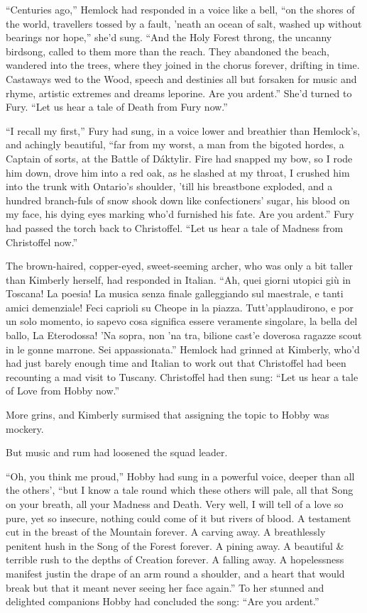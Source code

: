 \documentclass[11pt,a5paper]{article}
\begin{document}
``Centuries ago,'' Hemlock had responded in a voice like a bell, ``on the shores of the world, travellers tossed by a fault, 'neath an ocean of salt, washed up without bearings nor hope,'' she'd sung. ``And the Holy Forest throng, the uncanny birdsong, called to them more than the reach. They abandoned the beach, wandered into the trees, where they joined in the chorus forever, drifting in time. Castaways wed to the Wood, speech and destinies all but forsaken for music and rhyme, artistic extremes and dreams leporine. Are you ardent.'' She'd turned to Fury. ``Let us hear a tale of Death from Fury now.''

``I recall my first,'' Fury had sung, in a voice lower and breathier than Hemlock's, and achingly beautiful, ``far from my worst, a man from the bigoted hordes, a Captain of sorts, at the Battle of Dáktylir. Fire had snapped my bow, so I rode him down, drove him into a red oak, as he slashed at my throat, I crushed him into the trunk with Ontario's shoulder, 'till his breastbone exploded, and a hundred branch-fuls of snow shook down like confectioners' sugar, his blood on my face, his dying eyes marking who'd furnished his fate. Are you ardent.'' Fury had passed the torch back to Christoffel. ``Let us hear a tale of Madness from Christoffel now.''

The brown-haired, copper-eyed, sweet-seeming archer, who was only a bit taller than Kimberly herself, had responded in Italian. ``Ah, quei giorni utopici giù in Toscana! La poesia! La musica senza finale galleggiando sul maestrale, e tanti amici demenziale! Feci caprioli su Cheope in la piazza. Tutt'applaudirono, e por un solo momento, io sapevo cosa significa essere veramente singolare, la bella del ballo, La Eterodossa! 'Na sopra, non 'na tra, bilione cast'e doverosa ragazze scout in le gonne marrone. Sei appassionata.'' Hemlock had grinned at Kimberly, who'd had just barely enough time and Italian to work out that Christoffel had been recounting a mad visit to Tuscany. Christoffel had then sung: ``Let us hear a tale of Love from Hobby now.''

More grins, and Kimberly surmised that assigning the topic to Hobby was mockery.

But music and rum had loosened the squad leader.

``Oh, you think me proud,'' Hobby had sung in a powerful voice, deeper than all the others', ``but I know a tale round which these others will pale, all that Song on your breath, all your Madness and Death. Very well, I will tell of a love so pure, yet so insecure, nothing could come of it but rivers of blood. A testament cut in the breast of the Mountain forever. A carving away. A breathlessly penitent hush in the Song of the Forest forever. A pining away. A beautiful \& terrible rush to the depths of Creation forever. A falling away. A hopelessness manifest justin the drape of an arm round a shoulder, and a heart that would break but that it meant never seeing her face again.'' To her stunned and delighted companions Hobby had concluded the song: ``Are you ardent.''
\end{document}
